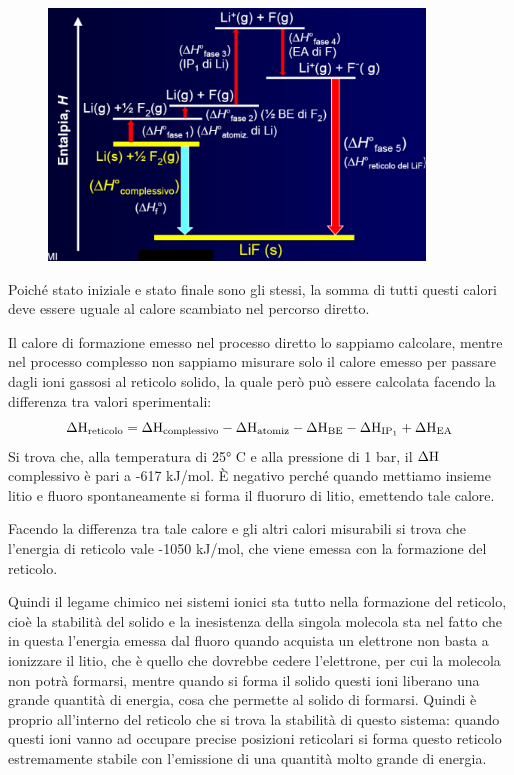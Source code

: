 \begin{figure}[htp]
    \centering
    \includegraphics[width=10cm]{immagini/Ciclo-Born-Haber.png}
\end{figure}

Poiché stato iniziale e stato finale sono gli stessi, la somma di tutti questi calori deve essere uguale al calore scambiato nel percorso diretto.

Il calore di formazione emesso nel processo diretto lo sappiamo calcolare, mentre nel processo complesso non sappiamo misurare solo il calore emesso per passare dagli ioni gassosi al reticolo solido, la quale però può essere calcolata facendo la differenza tra valori sperimentali:
$$\Delta\rm{H}_{reticolo}=\Delta\rm{H}_{complessivo} - \Delta\rm{H}_{atomiz} - \Delta\rm{H}_{BE} - \Delta\rm{H}_{IP_1} + \Delta\rm{H}_{EA}$$
Si trova che, alla temperatura di 25° C e alla pressione di 1 bar, il $\Delta\rm{H}$ complessivo è pari a -617 kJ/mol. È negativo perché quando mettiamo insieme litio e fluoro spontaneamente si forma il fluoruro di litio, emettendo tale calore.

Facendo la differenza tra tale calore e gli altri calori misurabili si trova che l'energia di reticolo vale -1050 kJ/mol, che viene emessa con la formazione del reticolo.

Quindi il legame chimico nei sistemi ionici sta tutto nella formazione del reticolo, cioè la stabilità del solido e la inesistenza della singola molecola sta nel fatto che in questa l'energia emessa dal fluoro quando acquista un elettrone non basta a ionizzare il litio, che è quello che dovrebbe cedere l'elettrone, per cui la molecola non potrà formarsi, mentre quando si forma il solido questi ioni liberano una grande quantità di energia, cosa che permette al solido di formarsi. Quindi è proprio all'interno del reticolo che si trova la stabilità di questo sistema: quando questi ioni vanno ad occupare precise posizioni reticolari si forma questo reticolo estremamente stabile con l'emissione di una quantità molto grande di energia.

